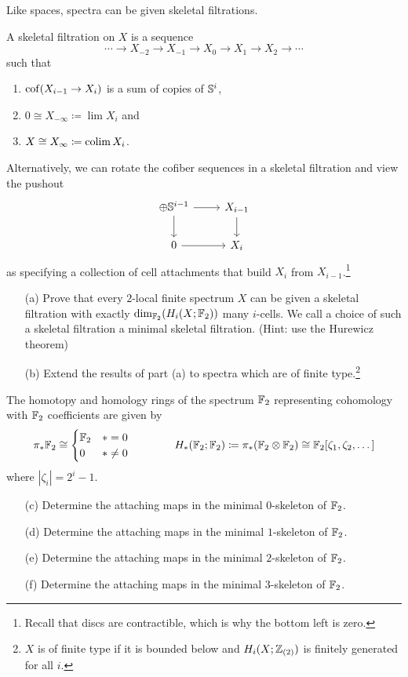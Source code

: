 \documentclass[reqno]{amsart}
\begin{document}
Like spaces, spectra can be given skeletal filtrations.

\begin{dfn}
  A skeletal filtration on $X$ is a sequence 
  \[ \cdots \to X_{-2} \to X_{-1} \to X_0 \to X_1 \to X_2 \to \cdots \]
  such that
  \begin{enumerate}
  \item $\operatorname{cof}(X_{i-1} \to X_i)$ is a sum of copies of $\mathbb{S}^i$,
  \item $0 \cong X_{-\infty} \coloneqq \lim X_i$ and
  \item $X \cong X_\infty \coloneqq \operatorname*{colim} X_i$.
  \end{enumerate}
\end{dfn}

Alternatively, we can rotate the cofiber sequences in a skeletal filtration and view
the pushout
\[ \begin{tikzcd}
  \oplus \Ss^{i-1} \ar[r] \ar[d] & X_{i-1} \ar[d] \\
  0 \ar[r] & X_{i}
\end{tikzcd} \]
as specifying a collection of cell attachments that build $X_i$ from $X_{i-1}$.\footnote{Recall that discs are contractible, which is why the bottom left is zero.}


\begin{enumerate}
\item[(a)] Prove that every $2$-local finite spectrum $X$ can be given a skeletal filtration with exactly $\mathrm{dim}_{\mathbb{F}_2}(H_i(X;\mathbb{F}_2))$ many $i$-cells. We call a choice of such a skeletal filtration a minimal skeletal filtration. (Hint: use the Hurewicz theorem)
\item[(b)] Extend the results of part (a) to spectra which are of finite type.\footnote{$X$ is of finite type if it is bounded below and $H_i(X;\mathbb{Z}_{(2)})$ is finitely generated for all $i$.}
\end{enumerate}

The homotopy and homology rings of the spectrum $\mathbb{F}_2$ representing cohomology with $\mathbb{F}_2$ coefficients are given by
\[ \pi_*\mathbb{F}_2 \cong \begin{cases} \mathbb{F}_2 & *=0 \\ 0 & *\neq 0 \end{cases} \qquad\qquad H_*(\mathbb{F}_2; \mathbb{F}_2) \coloneqq \pi_*(\mathbb{F}_2 \otimes \mathbb{F}_2) \cong \mathbb{F}_2[\zeta_1, \zeta_2, \dots] \]
where $|\zeta_i| = 2^{i} - 1$.

\begin{enumerate}
\item[(c)] Determine the attaching maps in the minimal $0$-skeleton of $\mathbb{F}_2$.
\item[(d)] Determine the attaching maps in the minimal $1$-skeleton of $\mathbb{F}_2$.
\item[(e)] Determine the attaching maps in the minimal $2$-skeleton of $\mathbb{F}_2$.
\item[(f)] Determine the attaching maps in the minimal $3$-skeleton of $\mathbb{F}_2$.
\end{enumerate}
\end{document}
